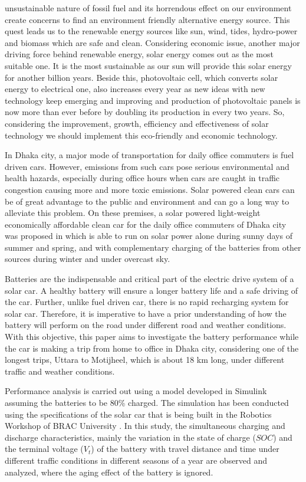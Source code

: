 \documentclass[journal]{IEEEtran/IEEEtran}
\begin{document}
	 unsustainable nature of fossil fuel and its horrendous effect on our environment create concerns to find an environment friendly alternative energy source. This quest leads us to the renewable energy sources like sun, wind, tides, hydro-power and biomass which are safe and clean. Considering economic issue, another major driving force behind renewable energy, solar energy comes out as the most suitable one. It is the most sustainable as our sun will provide this solar energy for another billion years. Beside this, photovoltaic cell, which converts solar energy to electrical one, also increases every year as new ideas with new technology keep emerging and improving and production of photovoltaic panels is now more than ever before by doubling its production in every two years. So, considering the improvement, growth, efficiency and effectiveness of solar technology we should implement this eco-friendly and economic technology.
	
	
	In Dhaka city, a major mode of transportation for daily office commuters is fuel driven cars. However, emissions from such cars pose serious environmental and health hazards, especially during office hours when cars are caught in traffic congestion causing more and more toxic emissions. Solar powered clean cars can be of great advantage to the public and environment and can go a long way to alleviate this problem. On these premises, a solar powered light-weight economically affordable clean car for the daily office commuters of Dhaka city was proposed in \cite{solar_car} which is able to run on solar power alone during sunny days of summer and spring, and with complementary charging of the batteries from other sources during winter and under overcast sky. 
	
	
	Batteries are the indispensable and critical part of the electric drive system of a solar car. A healthy battery will ensure a longer battery life and a safe driving of the car. Further, unlike fuel driven car, there is no rapid recharging system for solar car. Therefore, it is imperative to have a prior understanding of how the battery will perform on the road under different road and weather conditions. With this objective, this paper aims to investigate the battery performance while the car is making a trip from home to office in Dhaka city, considering one of the longest trips, Uttara to Motijheel, which is about 18 km long, under different traffic and weather conditions. 
	
	
	Performance analysis is carried out using a model developed in Simulink assuming the batteries to be 80\% charged. The simulation has been conducted using the specifications of the solar car that is being built in the Robotics Workshop of BRAC University \cite{srea}. In this study, the simultaneous charging and discharge characteristics, mainly the variation in the state of charge ($SOC$) and the terminal voltage ($V_t$) of the battery with travel distance and time under different traffic conditions in different seasons of a year are observed and analyzed, where the aging effect of the battery is ignored. 
	
\end{document}
